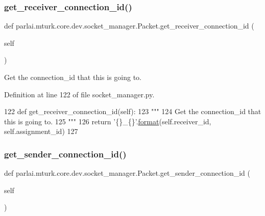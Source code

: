 \subsubsection{\texorpdfstring{get\+\_\+receiver\+\_\+connection\+\_\+id()}{get\_receiver\_connection\_id()}}
{\footnotesize\ttfamily def parlai.\+mturk.\+core.\+dev.\+socket\+\_\+manager.\+Packet.\+get\+\_\+receiver\+\_\+connection\+\_\+id (\begin{DoxyParamCaption}\item[{}]{self }\end{DoxyParamCaption})}

\begin{DoxyVerb}Get the connection_id that this is going to.
\end{DoxyVerb}
 

Definition at line 122 of file socket\+\_\+manager.\+py.


\begin{DoxyCode}
122     \textcolor{keyword}{def }get\_receiver\_connection\_id(self):
123         \textcolor{stringliteral}{"""}
124 \textcolor{stringliteral}{        Get the connection\_id that this is going to.}
125 \textcolor{stringliteral}{        """}
126         \textcolor{keywordflow}{return} \textcolor{stringliteral}{'\{\}\_\{\}'}.\hyperlink{namespaceparlai_1_1chat__service_1_1services_1_1messenger_1_1shared__utils_a32e2e2022b824fbaf80c747160b52a76}{format}(self.receiver\_id, self.assignment\_id)
127 
\end{DoxyCode}
\mbox{\label{classparlai_1_1mturk_1_1core_1_1dev_1_1socket__manager_1_1Packet_a65f708d63e94b812df966323c6c4e4b1}} 
\subsubsection{\texorpdfstring{get\+\_\+sender\+\_\+connection\+\_\+id()}{get\_sender\_connection\_id()}}
{\footnotesize\ttfamily def parlai.\+mturk.\+core.\+dev.\+socket\+\_\+manager.\+Packet.\+get\+\_\+sender\+\_\+connection\+\_\+id (\begin{DoxyParamCaption}\item[{}]{self }\end{DoxyParamCaption})}

